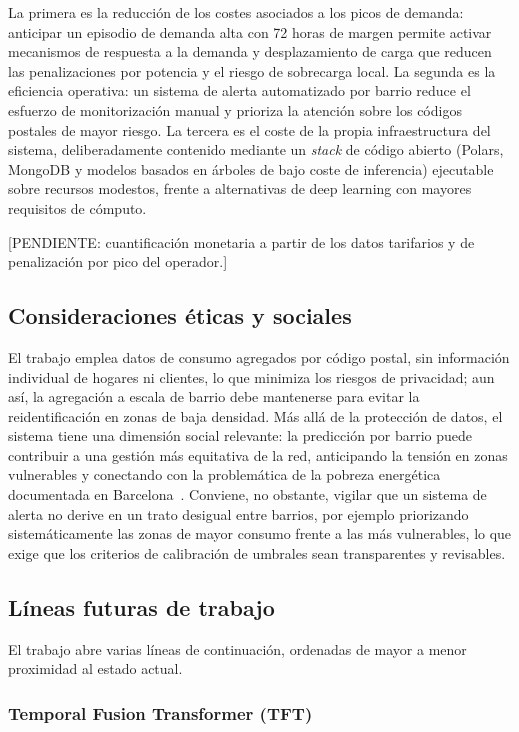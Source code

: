 \documentclass[12pt, a4paper]{article}
\begin{document}
La primera es la reducción de los costes asociados a los picos de demanda: anticipar un episodio de demanda alta con 72 horas de margen permite activar mecanismos de respuesta a la demanda y desplazamiento de carga que reducen las penalizaciones por potencia y el riesgo de sobrecarga local. La segunda es la eficiencia operativa: un sistema de alerta automatizado por barrio reduce el esfuerzo de monitorización manual y prioriza la atención sobre los códigos postales de mayor riesgo. La tercera es el coste de la propia infraestructura del sistema, deliberadamente contenido mediante un \textit{stack} de código abierto (Polars, MongoDB y modelos basados en árboles de bajo coste de inferencia) ejecutable sobre recursos modestos, frente a alternativas de deep learning con mayores requisitos de cómputo.

[PENDIENTE: cuantificación monetaria a partir de los datos tarifarios y de penalización por pico del operador.]

\subsection{Consideraciones éticas y sociales}

El trabajo emplea datos de consumo agregados por código postal, sin información individual de hogares ni clientes, lo que minimiza los riesgos de privacidad; aun así, la agregación a escala de barrio debe mantenerse para evitar la reidentificación en zonas de baja densidad. Más allá de la protección de datos, el sistema tiene una dimensión social relevante: la predicción por barrio puede contribuir a una gestión más equitativa de la red, anticipando la tensión en zonas vulnerables y conectando con la problemática de la pobreza energética documentada en Barcelona~\cite{maridelolmo2022}. Conviene, no obstante, vigilar que un sistema de alerta no derive en un trato desigual entre barrios, por ejemplo priorizando sistemáticamente las zonas de mayor consumo frente a las más vulnerables, lo que exige que los criterios de calibración de umbrales sean transparentes y revisables.

\subsection{Líneas futuras de trabajo}

El trabajo abre varias líneas de continuación, ordenadas de mayor a menor proximidad al estado actual.

\subsubsection{Temporal Fusion Transformer (TFT)}
\end{document}
